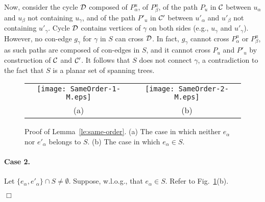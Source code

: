 \documentclass[letter,runningheads]{llncs}
\renewenvironment{proof}
{{\em Proof.\ }}{\hspace*{\fill}$\Box$\par\vspace{2mm}}
\begin{document}
\begin{proof}
Now, consider the cycle ${\cal D}$ composed of $P^u_{\alpha}$, of $P^u_{\beta}$, of the path $P_u$ in $\cal C$ between $u_{\alpha}$ and $u_{\beta}$ not containing $u_{\gamma}$, and of the path $P'_u$ in ${\cal C}'$ between $u'_{\alpha}$ and $u'_{\beta}$ not containing $u'_{\gamma}$. Cycle ${\cal D}$ contains vertices of $\gamma$ on both sides (e.g., $u_{\gamma}$ and $u'_{\gamma}$). However, no con-edge $g_{\gamma}$ for $\gamma$ in $S$ can cross ${\cal D}$. In fact, $g_{\gamma}$ cannot cross $P^u_{\alpha}$ or $P^u_{\beta}$, as such paths are composed of con-edges in $S$, and it cannot cross $P_u$ and $P'_u$ by construction of ${\cal C}$ and ${\cal C}'$. It follows that $S$ does not connect $\gamma$, a contradiction to the fact that $S$ is a planar set of spanning trees.

\begin{figure}[tb]
\begin{center}
\begin{tabular}{c c}
\mbox{\texttt{[image: SameOrder-1-M.eps]}} \hspace{1mm} &
\mbox{\texttt{[image: SameOrder-2-M.eps]}}\\
(a) \hspace{1mm} & (b)
\end{tabular}
\caption{Proof of Lemma~\ref{le:same-order}. (a) The case in which neither $e_{\alpha}$ nor $e'_{\alpha}$ belongs to $S$. (b) The case in which $e_{\alpha}\in S$.}
\label{fig:same-order}
\end{center}
\end{figure}

\paragraph{Case 2.} Let $\{e_{\alpha},e'_{\alpha}\}\cap S\neq \emptyset$. Suppose, w.l.o.g., that $e_{\alpha}\in S$. Refer to Fig.~\ref{fig:same-order}(b).


\end{proof}
\end{document}
